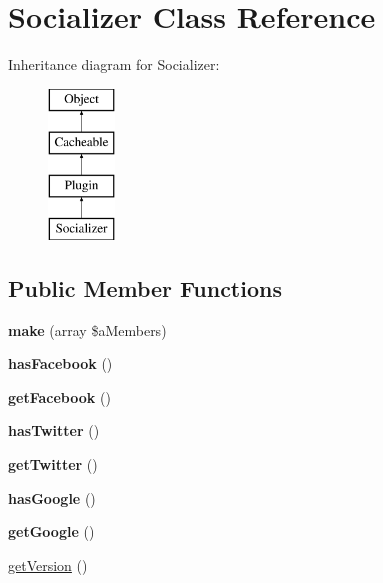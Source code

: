 \hypertarget{class_socializer}{\section{Socializer Class Reference}
\label{class_socializer}
}
Inheritance diagram for Socializer\-:\begin{figure}[H]
\begin{center}
\leavevmode
\includegraphics[height=4.000000cm]{class_socializer}
\end{center}
\end{figure}
\subsection*{Public Member Functions}
\begin{DoxyCompactItemize}
\item 
\hypertarget{class_socializer_aff4351d89e9cf62cf69033c06dd4da39}{{\bfseries make} (array \$a\-Members)}\label{class_socializer_aff4351d89e9cf62cf69033c06dd4da39}

\item 
\hypertarget{class_socializer_af715ac47c86730c6cddcd44e87fe2559}{{\bfseries has\-Facebook} ()}\label{class_socializer_af715ac47c86730c6cddcd44e87fe2559}

\item 
\hypertarget{class_socializer_a1d84301a722d00758d5f306d2952ae73}{{\bfseries get\-Facebook} ()}\label{class_socializer_a1d84301a722d00758d5f306d2952ae73}

\item 
\hypertarget{class_socializer_acab622407d80a6c0c7eb4fde6c9f411b}{{\bfseries has\-Twitter} ()}\label{class_socializer_acab622407d80a6c0c7eb4fde6c9f411b}

\item 
\hypertarget{class_socializer_aa866f42fb26ac4ac7505406cf5620199}{{\bfseries get\-Twitter} ()}\label{class_socializer_aa866f42fb26ac4ac7505406cf5620199}

\item 
\hypertarget{class_socializer_a057a76ba44b1796ed767dc7f7e619a5b}{{\bfseries has\-Google} ()}\label{class_socializer_a057a76ba44b1796ed767dc7f7e619a5b}

\item 
\hypertarget{class_socializer_afd3cbdfd3d7cf3d405bad2783c1980bb}{{\bfseries get\-Google} ()}\label{class_socializer_afd3cbdfd3d7cf3d405bad2783c1980bb}

\item 
\hyperlink{class_socializer_aee58b288f23c92c266c37965fd2fff1d}{get\-Version} ()
\end{DoxyCompactItemize}
